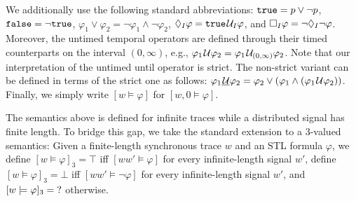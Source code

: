 We additionally use the following standard abbreviations: 
$\texttt{true} = p \lor \lnot p$,
$\texttt{false} = \lnot \texttt{true}$,
$ \varphi_1 \lor \varphi_2 = \lnot \varphi_1 \land \lnot \varphi_2$,
$\lozenge_I \varphi = \texttt{true} \kern.1em\mathcal{U}_I \varphi$, and
$\square_I \varphi = \lnot \lozenge_I \lnot \varphi$.
Moreover, the untimed temporal operators are defined through their timed counterparts on the interval $(0,\infty)$, e.g., $\varphi_1 \kern.1em\mathcal{U} \varphi_2 = \varphi_1 \kern.1em\mathcal{U}_{(0,\infty)} \varphi_2$.
Note that our interpretation of the untimed until operator is strict.
The non-strict variant can be defined in terms of the strict one as follows: $\varphi_1 \underline{\kern.1em\mathcal{U}} \varphi_2 = \varphi_2 \lor (\varphi_1 \land (\varphi_1 \kern.1em\mathcal{U} \varphi_2))$.
Finally, we simply write $[w \models \varphi]$ for $[w,0 \models \varphi]$.

The semantics above is defined for infinite traces while a distributed signal has finite length.
To bridge this gap, we take the standard extension to a 3-valued semantics:
Given a finite-length synchronous trace $w$ and an STL formula $\varphi$, 
we define $[w \models \varphi]_3 = \top$ iff $[w w' \models \varphi]$ for every infinite-length signal $w'$, define $[w \models \varphi]_3 = \bot$ iff $[w w' \models \lnot \varphi]$ for every infinite-length signal $w'$, and $[w \models \varphi]_3 = \text{?}$ otherwise.